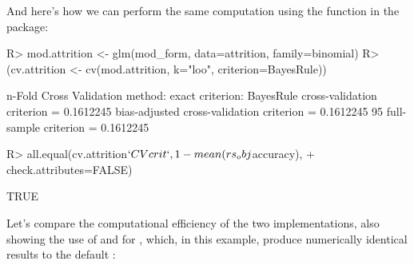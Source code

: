 \documentclass[
]{jss}
\begin{document}
And here's how we can perform the same computation using the 
function in the  package:

\begin{CodeChunk}
\begin{CodeInput}
R> mod.attrition <- glm(mod_form, data=attrition, family=binomial)
R> (cv.attrition <- cv(mod.attrition, k="loo", criterion=BayesRule))
\end{CodeInput}
\begin{CodeOutput}
n-Fold Cross Validation
method: exact
criterion: BayesRule
cross-validation criterion = 0.1612245
bias-adjusted cross-validation criterion = 0.1612245
95%
full-sample criterion = 0.1612245 
\end{CodeOutput}
\begin{CodeInput}
R> all.equal(cv.attrition$`CV crit`, 1 - mean(rs_obj$accuracy), 
+           check.attributes=FALSE)
\end{CodeInput}
\begin{CodeOutput}
[1] TRUE
\end{CodeOutput}
\end{CodeChunk}

Let's compare the computational efficiency of the two implementations,
also showing the use of  and
 for , which, in this example,
produce numerically identical results to the default
:
\end{document}
